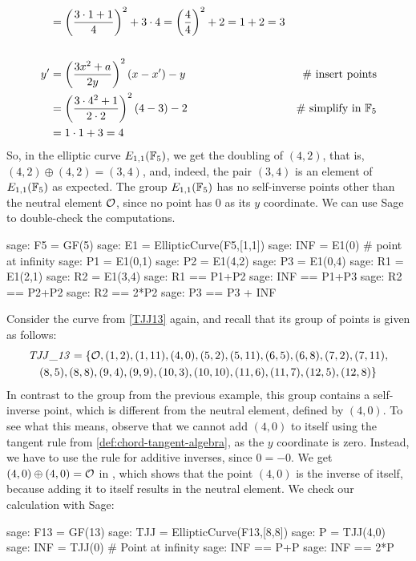\begin{example}
\begin{align*}
    & = \left(\frac{3\cdot 1+1}{4}\right)^2 +3\cdot 4
      = \left(\frac{4}{4}\right)^2 +2
      = 1 +2 
      = 3
\\
\\
y'  & = \left(\frac{3x^2+a}{2y}\right)^2\left(x-x'\right) - y  & \text{\# insert points} \\
    & = \left(\frac{3\cdot 4^2+1}{2\cdot 2}\right)^2\left(4-3\right) - 2 & \text{\# simplify in } \mathbb{F}_5\\
    & = 1\cdot 1 + 3
      = 4
\end{align*}
So, in the elliptic curve $E_{1,1}(\mathbb{F}_5)$, we get the doubling  of $(4,2)$, that is, $(4,2)\oplus (4,2) =(3,4)$, and, indeed, the pair $(3,4)$ is an element of $E_{1,1}(\mathbb{F}_5)$ as expected. The group $E_{1,1}(\mathbb{F}_5)$ has no self-inverse points other than the neutral element $\mathcal{O}$, since no point has $0$ as its $y$ coordinate. We can use Sage to double-check the computations. 
\begin{sagecommandline}
sage: F5 = GF(5)
sage: E1 = EllipticCurve(F5,[1,1])
sage: INF = E1(0) # point at infinity
sage: P1 = E1(0,1)
sage: P2 = E1(4,2)
sage: P3 = E1(0,4)
sage: R1 = E1(2,1)
sage: R2 = E1(3,4)
sage: R1 == P1+P2
sage: INF == P1+P3
sage: R2 == P2+P2
sage: R2 == 2*P2
sage: P3 == P3 + INF
\end{sagecommandline}
\end{example}
\begin{example}\label{ex:TJJ13-self-inverse} Consider the \TJJ{} curve from \examplename{} \ref{TJJ13} again, and recall that its group of points is given as follows:
\begin{multline}
\mathit{TJJ\_13} = \{\mathcal{O}, (1, 2), (1, 11), (4, 0), (5, 2), (5, 11), (6, 5), (6, 8), (7,2), (7, 11), \\ (8, 5), (8, 8), (9, 4), (9, 9), (10, 3), (10,
10), (11, 6), (11, 7), (12, 5), (12, 8)\}
\end{multline}
In contrast to the group from the previous example, this group contains a self-inverse point, which is different from the neutral element, defined by $(4,0)$. To see what this means, observe that we cannot add $(4,0)$ to itself using the tangent rule from  \ref{def:chord-tangent-algebra}, as the $y$ coordinate is zero. Instead, we have to use the rule for additive inverses, since $0=-0$. We get $(4,0)\oplus (4,0)=\mathcal{O}$ in \TJJ{}, which shows that the point $(4,0)$ is  the inverse of itself, because adding it to itself results in the neutral element. We check our calculation with Sage:

\begin{sagecommandline}
sage: F13 = GF(13)
sage: TJJ = EllipticCurve(F13,[8,8])
sage: P = TJJ(4,0)
sage: INF = TJJ(0) # Point at infinity
sage: INF == P+P
sage: INF == 2*P
\end{sagecommandline}
\end{example}
